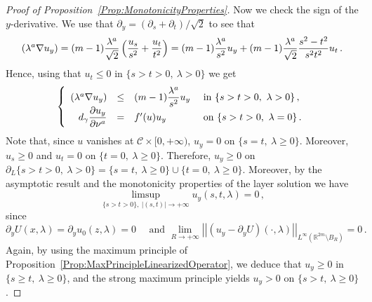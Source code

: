 \documentclass[12pt,reqno]{amsart}
\theoremstyle{definition}
\theoremstyle{remark}
\newcommand{\con}[1]{\mathbb{#1}}
\newcommand{\R}{\con{R}} %
\newcommand{\ccal}{\mathscr{C}}
\newcommand{\norm}[1]{\left | \left |{#1} \right | \right |}
\newcommand{\s}{\gamma}
\newcommand{\bpar}[1]{\left ( {#1}\right )}
\newcommand\beqc[1]{\left\{\begin{array}{#1}}
\newcommand\eeqc{\end{array} \right.}
\def\PDEsystem{rcll}
\let\div\relax
\DeclareMathOperator{\div}{div}
\numberwithin{equation}{section}
\begin{document}
\begin{proof}[Proof of Proposition~\ref{Prop:MonotonicityProperties}]
Now we check the sign of the $y$-derivative. We use that $\partial_y = (\partial_s + \partial_t)/\sqrt{2}$ to see that
$$
\div (\lambda^a \nabla u_y) = (m-1) \dfrac{\lambda^a}{\sqrt{2}}\bpar{ \dfrac{u_s}{s^2} + \dfrac{u_t}{t^2} } = (m-1) \dfrac{\lambda^a}{s^2} u_y + (m-1) \dfrac{\lambda^a}{\sqrt{2}} \dfrac{s^2 - t^2}{s^2t^2} u_t \, . 
$$
Hence, using that $u_t \leq 0$ in $ \{ s > t>0,\ \lambda > 0\} $ we get
$$
\beqc{\PDEsystem}
\div (\lambda^a \nabla u_y) &\leq & (m-1) \dfrac{\lambda^a}{s^2} u_y & \text{ in } \{ s > t > 0 ,\ \lambda > 0\}\,, \\
d_\s \dfrac{\partial u_y}{\partial \nu^a}& = & f'(u)u_y& \text{ on }  \{ s > t > 0 , \ \lambda = 0\}\,.
\eeqc
$$
Note that, since $u$ vanishes at $\ccal \times [0, +\infty)$, $u_y = 0$ on $\{ s=t, \ \lambda \geq 0\}$. Moreover, $u_s\geq 0$ and $u_t = 0$ on $\{t=0, \ \lambda \geq 0\}$. Therefore, $u_y \geq 0$ on $\partial_L \{ s > t > 0 ,\ \lambda > 0\} = \{s = t,\ \lambda \geq 0 \}\cup \{t=0, \ \lambda \geq 0\}$. Moreover, by the asymptotic result and the monotonicity properties of the layer solution we have
$$
\limsup_{\{s> t>0\} ,\ |(s,t)|\to +\infty}  u_y(s,t,\lambda) = 0\,,
$$
since
$$
\partial_y U (x,\lambda) = \partial_y u_0(z,\lambda)=  0 \quad \text{ and } \lim_{R\to +\infty} \norm{(u_y - \partial_y U) (\cdot,\lambda) }_{L^\infty(\R^{2m}\setminus B_{R})} = 0\,.
$$
Again, by using the maximum principle of Proposition~\ref{Prop:MaxPrincipleLinearizedOperator}, we deduce that $u_y \geq 0$ in $\{ s \geq t,\ \lambda \geq 0\}$, and the strong maximum principle yields $u_y > 0$ on $\{ s > t,\ \lambda \geq 0\}$.


\end{proof}
\end{document}
